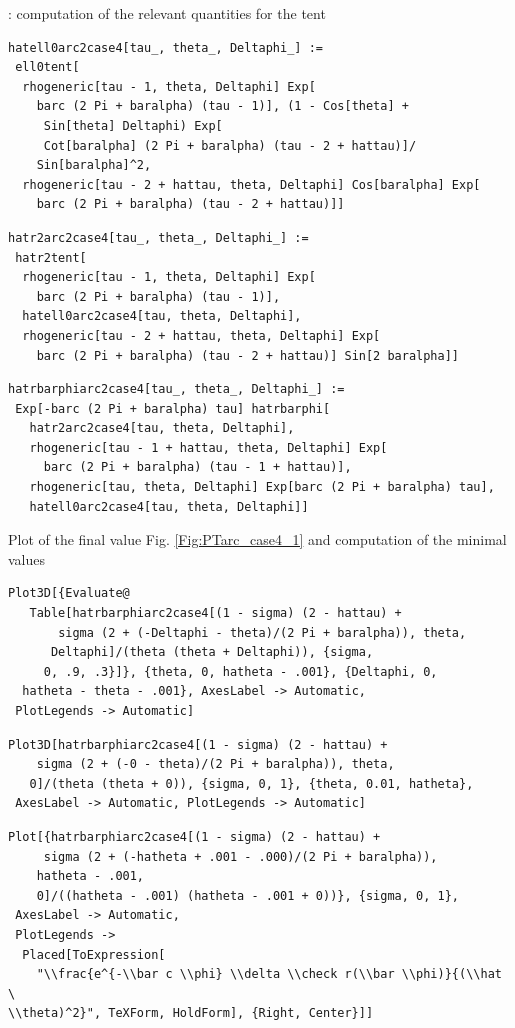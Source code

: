 \documentclass[reqno]{amsart}
\theoremstyle{definition} \newtheorem{definition}{Definition}[section]
\theoremstyle{definition} \newtheorem{remark}[definition]{Remark}
\theoremstyle{plain} \newtheorem{lemma}[definition]{Lemma}
\theoremstyle{plain} \newtheorem{proposition}[definition]{Proposition}
\theoremstyle{plain} \newtheorem{theorem}[definition]{Theorem}
\theoremstyle{plain} \newtheorem{corollary}[definition]{Corollary}
\theoremstyle{definition} \newtheorem{example}[definition]{Example}
\theoremstyle{plain} \newtheorem{claim}[clai]{Claim}
\theoremstyle{definition} \newtheorem{assumption}[definition]{Assumption}
\theoremstyle{definition} \newtheorem{observation}[definition]{Observation}
\newcommand{\1}{\mathbbm 1}
\newcommand{\smed}{\medskip}
\numberwithin{equation}{section} %
\theoremstyle{plain} \newtheorem*{theorem*}{Theorem}
\theoremstyle{plain} \newtheorem{mthm}[maintheorem]{Main Theorem}
\theoremstyle{plain} \newtheorem*{mthm*}{Main Theorem}
\theoremstyle{plain} \newtheorem*{conjecture*}{Conjecture}
\theoremstyle{plain} \newtheorem{conjecture}[definition]{Conjecture}
\theoremstyle{plain} \newtheorem*{problem*}{Problem}
\begin{document}
: computation of the relevant quantities for the tent
\smed
\begin{verbatim}
hatell0arc2case4[tau_, theta_, Deltaphi_] := 
 ell0tent[
  rhogeneric[tau - 1, theta, Deltaphi] Exp[
    barc (2 Pi + baralpha) (tau - 1)], (1 - Cos[theta] + 
     Sin[theta] Deltaphi) Exp[
     Cot[baralpha] (2 Pi + baralpha) (tau - 2 + hattau)]/
    Sin[baralpha]^2, 
  rhogeneric[tau - 2 + hattau, theta, Deltaphi] Cos[baralpha] Exp[
    barc (2 Pi + baralpha) (tau - 2 + hattau)]]
\end{verbatim}
\begin{verbatim}
hatr2arc2case4[tau_, theta_, Deltaphi_] := 
 hatr2tent[
  rhogeneric[tau - 1, theta, Deltaphi] Exp[
    barc (2 Pi + baralpha) (tau - 1)], 
  hatell0arc2case4[tau, theta, Deltaphi], 
  rhogeneric[tau - 2 + hattau, theta, Deltaphi] Exp[
    barc (2 Pi + baralpha) (tau - 2 + hattau)] Sin[2 baralpha]]
\end{verbatim}
\begin{verbatim}
hatrbarphiarc2case4[tau_, theta_, Deltaphi_] := 
 Exp[-barc (2 Pi + baralpha) tau] hatrbarphi[
   hatr2arc2case4[tau, theta, Deltaphi], 
   rhogeneric[tau - 1 + hattau, theta, Deltaphi] Exp[
     barc (2 Pi + baralpha) (tau - 1 + hattau)], 
   rhogeneric[tau, theta, Deltaphi] Exp[barc (2 Pi + baralpha) tau], 
   hatell0arc2case4[tau, theta, Deltaphi]]
\end{verbatim}
\smed
Plot of the final value Fig. \ref{Fig:PTarc_case4_1} and computation of the minimal values
\smed
\begin{verbatim}
Plot3D[{Evaluate@
   Table[hatrbarphiarc2case4[(1 - sigma) (2 - hattau) + 
       sigma (2 + (-Deltaphi - theta)/(2 Pi + baralpha)), theta, 
      Deltaphi]/(theta (theta + Deltaphi)), {sigma, 
     0, .9, .3}]}, {theta, 0, hatheta - .001}, {Deltaphi, 0, 
  hatheta - theta - .001}, AxesLabel -> Automatic, 
 PlotLegends -> Automatic]
\end{verbatim}
\begin{verbatim}
Plot3D[hatrbarphiarc2case4[(1 - sigma) (2 - hattau) + 
    sigma (2 + (-0 - theta)/(2 Pi + baralpha)), theta, 
   0]/(theta (theta + 0)), {sigma, 0, 1}, {theta, 0.01, hatheta}, 
 AxesLabel -> Automatic, PlotLegends -> Automatic]
\end{verbatim}
\begin{verbatim}
Plot[{hatrbarphiarc2case4[(1 - sigma) (2 - hattau) + 
     sigma (2 + (-hatheta + .001 - .000)/(2 Pi + baralpha)), 
    hatheta - .001, 
    0]/((hatheta - .001) (hatheta - .001 + 0))}, {sigma, 0, 1}, 
 AxesLabel -> Automatic, 
 PlotLegends -> 
  Placed[ToExpression[
    "\\frac{e^{-\\bar c \\phi} \\delta \\check r(\\bar \\phi)}{(\\hat \
\\theta)^2}", TeXForm, HoldForm], {Right, Center}]]
\end{verbatim}
\end{document}
